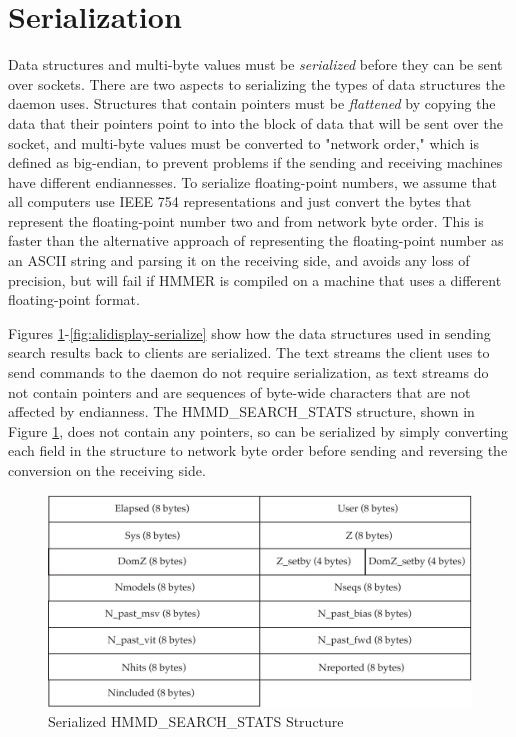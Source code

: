 \documentclass[notoc,justified]{tufte-book}    %
\begin{document}
\section{Serialization}
Data structures and multi-byte values must be {\em serialized} before they can be sent over sockets.  There are two aspects to serializing the types of data structures the daemon uses.  Structures that contain pointers must be {\em flattened} by copying the data that their pointers point to into the block of data that will be sent over the socket, and multi-byte values must be converted to "network order," which is defined as big-endian, to prevent problems if the sending and receiving machines have different endiannesses.  To serialize floating-point numbers, we assume that all computers use IEEE 754 representations and just convert the bytes that represent the floating-point number two and from network byte order.  This is faster than the alternative approach of representing the floating-point number as an ASCII string and parsing it on the receiving side, and avoids any loss of precision, but will fail if HMMER is compiled on a machine that uses a different floating-point format.  

Figures \ref{fig:search-stats-serialize}-\ref{fig:alidisplay-serialize} show how the data structures used in sending search results back to clients are serialized.  The text streams the client uses to send commands to the daemon do not require serialization, as text streams do not contain pointers and are sequences of byte-wide characters that are not affected by endianness.  The {HMMD\_SEARCH\_STATS} structure, shown in Figure \ref{fig:search-stats-serialize}, does not contain any pointers, so can be serialized by simply converting each field in the structure to network byte order before sending and reversing the conversion on the receiving side.  

\begin{figure}
\includegraphics[width=\textwidth]{inclusions/hmmpgmd-search-stats-serialize.pdf}
\caption{Serialized {HMMD\_SEARCH\_STATS} Structure}
\label{fig:search-stats-serialize}
\end{figure} 
\end{document}
